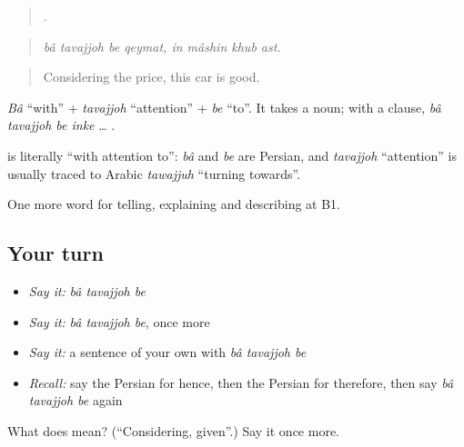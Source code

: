 \begin{quote}
       .
\end{quote}

\begin{quote}
\emph{bâ tavajjoh be qeymat, in mâshin khub ast.}
\end{quote}

\begin{quote}
Considering the price, this car is good.
\end{quote}

\emph{Bâ} \textquotedblleft{}with\textquotedblright{} + \emph{tavajjoh} \textquotedblleft{}attention\textquotedblright{} + \emph{be} \textquotedblleft{}to\textquotedblright{}. It takes a noun; with a clause, \emph{bâ tavajjoh be inke} … .

\begin{cousinweb}
\textbf{  } is literally \textquotedblleft{}with attention to\textquotedblright{}: \emph{bâ} and \emph{be} are Persian, and \emph{tavajjoh} \textquotedblleft{}attention\textquotedblright{} is usually traced to Arabic \emph{tawajjuh} \textquotedblleft{}turning towards\textquotedblright{}.
\end{cousinweb}

\begin{grammarlens}[title={What you've built}]
One more word for telling, explaining and describing at B1.
\end{grammarlens}

\subsection*{Your turn}
\begin{itemize}
\raggedright
  \item \emph{Say it:} \emph{bâ tavajjoh be}
  \item \emph{Say it:} \emph{bâ tavajjoh be}, once more
  \item \emph{Say it:} a sentence of your own with \emph{bâ tavajjoh be}
  \item \emph{Recall:} say the Persian for hence, then the Persian for therefore, then say \emph{bâ tavajjoh be} again
\end{itemize}

\begin{tcolorbox}[breakable,colback=teal!4,colframe=teal!35!black,title={Before you move on}]
What does    mean? (\textquotedblleft{}Considering, given\textquotedblright{}.) Say it once more.
\end{tcolorbox}
